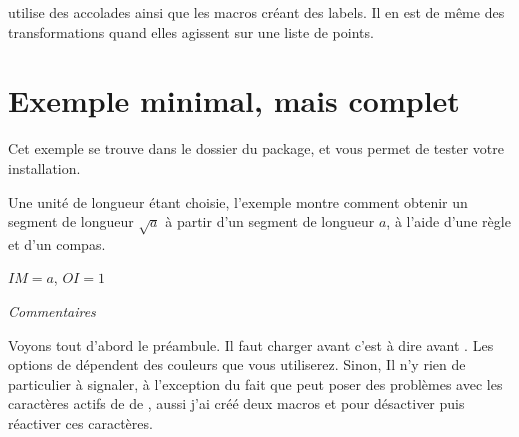  utilise des accolades ainsi que les macros créant des labels. Il en est de même des transformations quand elles agissent sur une liste de points. 


\clearpage \newpage
\section{Exemple minimal, mais complet}
Cet exemple se trouve dans le dossier du package, et vous permet de tester votre installation.

Une unité de longueur étant choisie, l'exemple montre comment obtenir un segment de longueur $\sqrt{a}$ à partir d'un segment de longueur $a$, à l'aide d'une règle et d'un compas. 

$IM=a$, $OI=1$

\vspace{12pt}
\hypertarget{firstex}{}
\begin{center}
\end{center}

\emph{Commentaires}

 Voyons tout d'abord le préambule. Il faut charger  avant   c'est à dire avant \TIKZ. Les options de  dépendent des couleurs que vous utiliserez. Sinon, Il n'y  rien de particulier à signaler, à l'exception du fait que \TIKZ{} peut poser des problèmes avec les caractères actifs de  de , aussi j'ai créé deux macros   et  pour désactiver puis réactiver ces caractères.

\begin{center}
\end{center}


